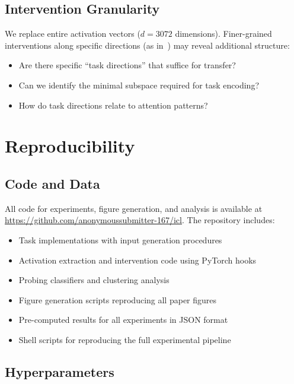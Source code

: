 \documentclass[sigconf,anonymous]{acmart}
\begin{document}
\subsection{Intervention Granularity}

We replace entire activation vectors ($d=3072$ dimensions). Finer-grained interventions along specific directions (as in~\cite{todd2023function}) may reveal additional structure:
\begin{itemize}
    \item Are there specific ``task directions'' that suffice for transfer?
    \item Can we identify the minimal subspace required for task encoding?
    \item How do task directions relate to attention patterns?
\end{itemize}

\section{Reproducibility}
\label{app:reproducibility}

\subsection{Code and Data}

All code for experiments, figure generation, and analysis is available at \url{https://github.com/anonymoussubmitter-167/icl}. The repository includes:
\begin{itemize}
    \item Task implementations with input generation procedures
    \item Activation extraction and intervention code using PyTorch hooks
    \item Probing classifiers and clustering analysis
    \item Figure generation scripts reproducing all paper figures
    \item Pre-computed results for all experiments in JSON format
    \item Shell scripts for reproducing the full experimental pipeline
\end{itemize}

\subsection{Hyperparameters}
\end{document}
